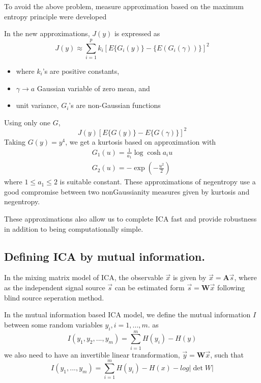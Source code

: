 \documentclass[]{article}
\begin{document}
To avoid the above problem, measure approximation based on the maximum entropy principle were developed 

In the new approximations, $J(y)$ is expressed as 
\begin{equation}
J(y) \approx \sum _{i=1}^p k_i [E\{ G_i (y)\} - \{ E(G_i(\gamma) ) \}]^2
\end{equation}
\begin{itemize}
	\item where $k_i$'s are positive constants,
	\item $\gamma \to a$ Gaussian  variable of zero mean, and
	\item unit variance, $G_i$'s are non-Gaussian functions
\end{itemize}
Using only one $G$,
\begin{equation}
J(y) [ E \{ G(y) \} - E\{ G(\gamma) \} ]^2
\end{equation}
Taking $G(y) = y^4$, we get a kurtosis based on approximation with 
\begin{eqnarray}
G_1(u) = \frac{1}{a_1} \log \cosh a_i u \\
G_2(u) = - \exp ( - \frac{u^2}{2})
\end{eqnarray}
where $1 \le a_1 \le 2$ is suitable constant.  These approximations of negentropy use a good compromise between two nonGaussianity measures given by kurtosis and negentropy.  

These approximations also allow us to complete ICA fast and provide robustness in addition to being computationally simple.  

\subsection{Defining ICA by mutual information.}

In the mixing matrix model of ICA, the observable $\vec{x}$ is given by $\vec{x} = \mathbf{A} \vec{s}$, where as the independent signal source $\vec{s}$ can be estimated form $\vec{s} = \mathbf{W} \vec{x}$ following blind source seperation method.  

In the mutual information based ICA model, we define the mutual information $I$ between some  random variables $y_i , i = 1, ..., m$.  as 
\begin{equation}
I (y _1, y_2, ..., y_m ) = \sum _{i=1}^m H(y_i) - H(y)
\end{equation}
we also need to have an invertible linear transformation, $\vec{y} = \mathbf{W}\vec{x}$, such that 
\begin{equation}
I(y_1, ..., y_m ) = \sum _{i=1}^m H(y_i ) - H(x) - log | \det W | 
\end{equation}
\end{document}
